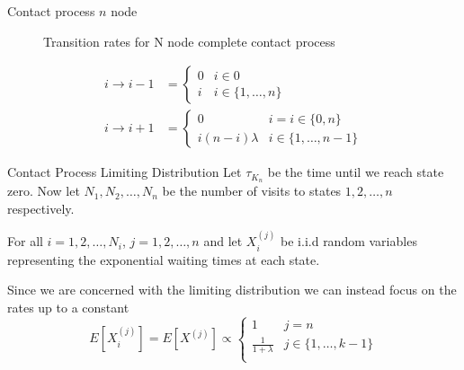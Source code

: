 \documentclass{beamer}
\theoremstyle{definition}
\begin{document}
\begin{frame}{Contact process $n$ node}
    \begin{figure}[H]
    \centering
    \caption{Transition rates for N node complete contact process}
    \label{fig:complete_contact_n_node_rates}
\end{figure}

\begin{align*}
    i \to i - 1 &= \begin{cases}
        0 & i \in 0\\
        i & i \in \{1,\ldots, n\}
    \end{cases}\\
    i \to i + 1 &= \begin{cases}
        0 & i = i \in \{0, n\}\\
        i(n - i) \lambda & i \in \{1,\ldots, n-1\}
    \end{cases}
\end{align*}
\end{frame}

\begin{frame}{Contact Process Limiting Distribution}
    Let $\tau_{K_n}$ be the time until we reach state zero.
Now let $N_1, N_2, \ldots, N_n$ be the number of visits to states $1, 2, \ldots, n$ respectively.

For all $i = 1,2,\ldots, N_i$, $j = 1,2,\ldots, n$ and let $X_i^{(j)}$ be i.i.d random variables representing the exponential waiting times at each state.

Since we are concerned with the limiting distribution we can instead focus on the rates up to a constant
$$
E[X_i^{(j)}] = E[X^{(j)}] \propto \begin{cases}
  1 & j = n\\
  \frac{1}{1 + \lambda} & j \in \{1,\ldots, k - 1\}\\
\end{cases}
$$
\end{frame}
\end{document}

